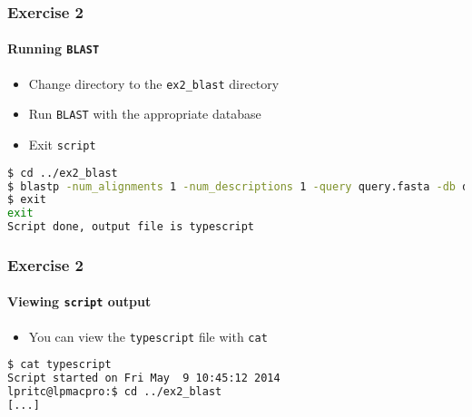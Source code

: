 \begin{frame}[fragile]
  \frametitle{Exercise 2}
  \framesubtitle{Running \texttt{BLAST}}
  \begin{itemize}
    \item Change directory to the \texttt{ex2\_blast} directory
    \item Run \texttt{BLAST} with the appropriate database
    \item Exit \texttt{script}
  \end{itemize}
\begin{lstlisting}[language=bash]
$ cd ../ex2_blast
$ blastp -num_alignments 1 -num_descriptions 1 -query query.fasta -db dbA
$ exit
exit
Script done, output file is typescript
\end{lstlisting}    
\end{frame}

\begin{frame}[fragile]
  \frametitle{Exercise 2}
  \framesubtitle{Viewing \texttt{script} output}
  \begin{itemize}
    \item You can view the \texttt{typescript} file with \texttt{cat}
  \end{itemize}
\begin{lstlisting}[language=bash]
$ cat typescript
Script started on Fri May  9 10:45:12 2014
lpritc@lpmacpro:$ cd ../ex2_blast
[...]
\end{lstlisting}    
\end{frame}

